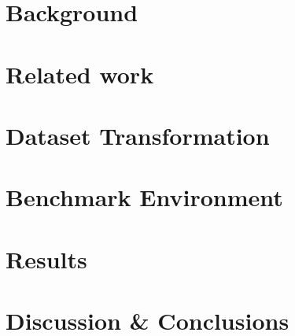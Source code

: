 \documentclass[a4paper,11pt,openany]{kth-mag}
\begin{document}
\chapter{Background}
    
\chapter{Related work}
     \label{related_work}
\chapter{Dataset Transformation}
    
\chapter{Benchmark Environment}
    
\chapter{Results}
    
\chapter{Discussion \& Conclusions}
    
    
\nocite{*}
\printbibliography




\end{document}
